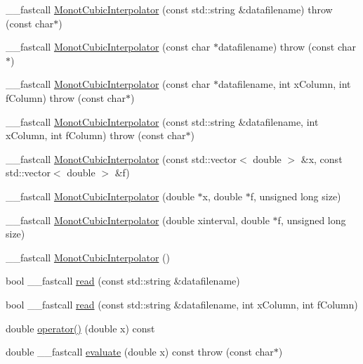 \begin{DoxyCompactItemize}
\item 
\+\_\+\+\_\+fastcall \hyperlink{class_monot_cubic_interpolator_ac71ea20790dafcdf9e863fda380d13e9}{Monot\+Cubic\+Interpolator} (const std\+::string \&datafilename)  throw (const char$\ast$)
\item 
\+\_\+\+\_\+fastcall \hyperlink{class_monot_cubic_interpolator_adfb7eebaa3307aacfa5a9573a67ec29a}{Monot\+Cubic\+Interpolator} (const char $\ast$datafilename)  throw (const char$\ast$)
\item 
\+\_\+\+\_\+fastcall \hyperlink{class_monot_cubic_interpolator_a4ee0d3c7c478b5e2746915bae6983341}{Monot\+Cubic\+Interpolator} (const char $\ast$datafilename, int x\+Column, int f\+Column)  throw (const char$\ast$)
\item 
\+\_\+\+\_\+fastcall \hyperlink{class_monot_cubic_interpolator_a958dd49cc3ce71ea810412de9c6fac9e}{Monot\+Cubic\+Interpolator} (const std\+::string \&datafilename, int x\+Column, int f\+Column)  throw (const char$\ast$)
\item 
\+\_\+\+\_\+fastcall \hyperlink{class_monot_cubic_interpolator_ae28e801bbc8e9c0a15cab5469f14ef46}{Monot\+Cubic\+Interpolator} (const std\+::vector$<$ double $>$ \&x, const std\+::vector$<$ double $>$ \&f)
\item 
\+\_\+\+\_\+fastcall \hyperlink{class_monot_cubic_interpolator_a1e41c54d95a685e58474b28916bb5c92}{Monot\+Cubic\+Interpolator} (double $\ast$x, double $\ast$f, unsigned long size)
\item 
\+\_\+\+\_\+fastcall \hyperlink{class_monot_cubic_interpolator_ad09819b7952a9eeef9815ec99315c0f3}{Monot\+Cubic\+Interpolator} (double xinterval, double $\ast$f, unsigned long size)
\item 
\+\_\+\+\_\+fastcall \hyperlink{class_monot_cubic_interpolator_afbcec8e7d6f3a244feec7d469ad92876}{Monot\+Cubic\+Interpolator} ()
\item 
bool \+\_\+\+\_\+fastcall \hyperlink{class_monot_cubic_interpolator_a66e8edca34bee56a92719d7d46aca7c3}{read} (const std\+::string \&datafilename)
\item 
bool \+\_\+\+\_\+fastcall \hyperlink{class_monot_cubic_interpolator_a44fe66eb09f1412f94bbcb29c4abca33}{read} (const std\+::string \&datafilename, int x\+Column, int f\+Column)
\item 
double \hyperlink{class_monot_cubic_interpolator_a5972ee0cd4866c46e289e507124c491e}{operator()} (double x) const 
\item 
double \+\_\+\+\_\+fastcall \hyperlink{class_monot_cubic_interpolator_a2d0311c6420c493cce042dd7bfb61270}{evaluate} (double x) const   throw (const char$\ast$)

\end{DoxyCompactItemize}
